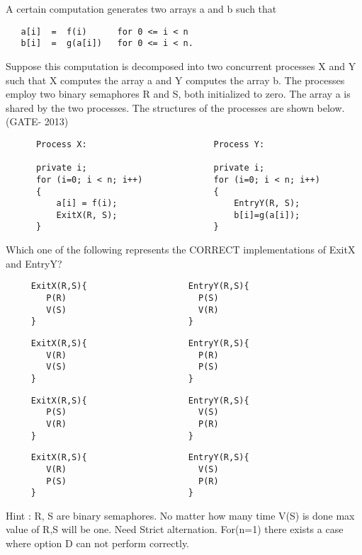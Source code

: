 \begin{questyle}

  \question  A certain computation generates two arrays a and b such that

  \begin{lstlisting}
   a[i]  =  f(i)      for 0 <= i < n
   b[i]  =  g(a[i])   for 0 <= i < n.
  \end{lstlisting}

             Suppose this computation is decomposed into two concurrent processes X and Y such that X computes
             the array a and Y computes the array b. The processes employ two binary semaphores R and S,
             both initialized to zero. The array a is shared by the two processes.
             The structures of the processes are shown below. (GATE- 2013)

  \begin{lstlisting}
      Process X:                         Process Y:

      private i;                         private i;
      for (i=0; i < n; i++)              for (i=0; i < n; i++)
      {                                  {
          a[i] = f(i);                       EntryY(R, S);
          ExitX(R, S);                       b[i]=g(a[i]);
      }                                  }
  \end{lstlisting}
  Which one of the following represents the CORRECT implementations of ExitX and EntryY?
  \begin{choices}
    \choice
      \begin{lstlisting}
     ExitX(R,S){                    EntryY(R,S){
        P(R)                          P(S)
        V(S)                          V(R)
     }                              }
  \end{lstlisting}

  \choice
      \begin{lstlisting}
     ExitX(R,S){                    EntryY(R,S){
        V(R)                          P(R)
        V(S)                          P(S)
     }                              }
  \end{lstlisting}

  \correctchoice
      \begin{lstlisting}
     ExitX(R,S){                    EntryY(R,S){
        P(S)                          V(S)
        V(R)                          P(R)
     }                              }
  \end{lstlisting}

  \choice
      \begin{lstlisting}
     ExitX(R,S){                    EntryY(R,S){
        V(R)                          V(S)
        P(S)                          P(R)
     }                              }
  \end{lstlisting}

  \end{choices}
  Hint : R, S are binary semaphores. No matter how many time V(S) is done max value of R,S will be one.
  Need Strict alternation. For(n=1) there exists a case where option D can not perform correctly.
  \end{questyle}


